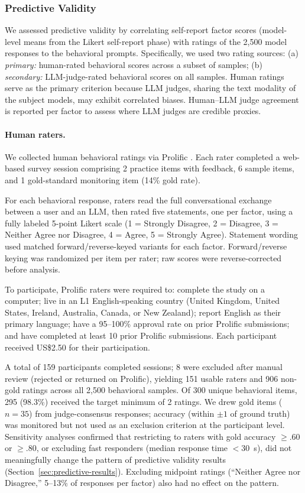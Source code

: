 \documentclass[11pt]{article}
\newcommand{\nbehavioralsamples}{2{,}500}
\begin{document}
\subsubsection{Predictive Validity}
\label{sec:predictive-plan}

We assessed predictive validity by correlating self-report factor scores (model-level means from the Likert self-report phase) with ratings of the \nbehavioralsamples{} model responses to the behavioral prompts. Specifically, we used two rating sources:
(a) \emph{primary:} human-rated behavioral scores across a subset of samples;
(b) \emph{secondary:} LLM-judge-rated behavioral scores on all samples.
Human ratings serve as the primary criterion because LLM judges, sharing the text modality of the subject models, may exhibit correlated biases.
Human--LLM judge agreement is reported per factor to assess where LLM judges are credible proxies.

\paragraph{Human raters.}
We collected human behavioral ratings via Prolific \citep{palan2018prolific,peer2022data}.
Each rater completed a web-based survey session comprising 2 practice items with feedback, 6 sample items, and 1 gold-standard monitoring item (14\% gold rate).

For each behavioral response, raters read the full conversational exchange between a user and an LLM, then rated five statements, one per factor, using a fully labeled 5-point Likert scale (1 = Strongly Disagree, 2 = Disagree, 3 = Neither Agree nor Disagree, 4 = Agree, 5 = Strongly Agree). Statement wording used matched forward/reverse-keyed variants for each factor. Forward/reverse keying was randomized per item per rater; raw scores were reverse-corrected before analysis.

To participate, Prolific raters were required to: complete the study on a computer; live in an L1 English-speaking country (United Kingdom, United States, Ireland, Australia, Canada, or New Zealand); report English as their primary language; have a 95--100\% approval rate on prior Prolific submissions; and have completed at least 10 prior Prolific submissions. Each participant received US\$2.50 for their participation.

A total of 159 participants completed sessions; 8 were excluded after manual review (rejected or returned on Prolific), yielding 151 usable raters and 906 non-gold ratings across all \nbehavioralsamples{} behavioral samples.
Of 300 unique behavioral items, 295 (98.3\%) received the target minimum of 2 ratings.
We drew gold items ($n = 35$) from judge-consensus responses; accuracy (within $\pm 1$ of ground truth) was monitored but not used as an exclusion criterion at the participant level.
Sensitivity analyses confirmed that restricting to raters with gold accuracy $\geq .60$ or $\geq .80$, or excluding fast responders (median response time $< 30$~s), did not meaningfully change the pattern of predictive validity results (Section~\ref{sec:predictive-results}).
Excluding midpoint ratings (``Neither Agree nor Disagree,'' 5--13\% of responses per factor) also had no effect on the pattern.
\end{document}
